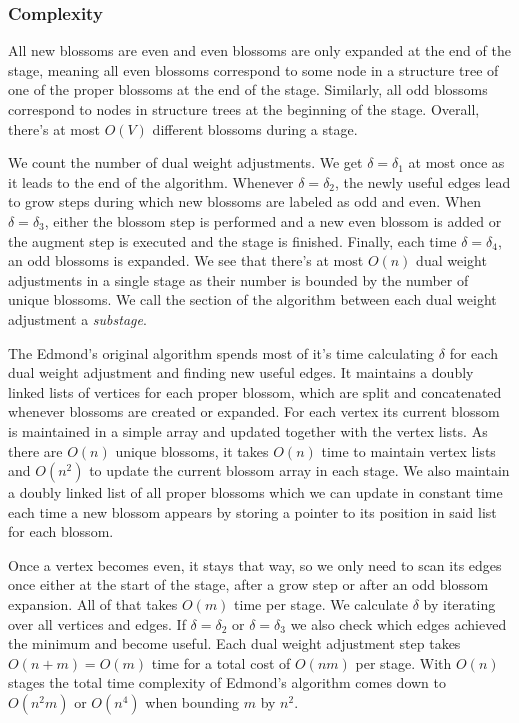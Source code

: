 \subsubsection{Complexity}

All new blossoms are even and even blossoms are only expanded at the end of the stage, meaning all even blossoms correspond to some node in a structure tree of one of the proper blossoms at the end of the stage. Similarly, all odd blossoms correspond to nodes in structure trees at the beginning of the stage. Overall, there's at most $O(V)$ different blossoms during a stage. 

We count the number of dual weight adjustments. We get $\delta = \delta_1$ at most once as it leads to the end of the algorithm. Whenever $\delta = \delta_2$, the newly useful edges lead to grow steps during which new blossoms are labeled as odd and even. When $\delta = \delta_3$, either the blossom step is performed and a new even blossom is added or the augment step is executed and the stage is finished. Finally, each time $\delta = \delta_4$, an odd blossoms is expanded. We see that there's at most $O(n)$ dual weight adjustments in a single stage as their number is bounded by the number of unique blossoms. We call the section of the algorithm between each dual weight adjustment a \textit{substage}.

The Edmond's original algorithm spends most of it's time calculating $\delta$ for each dual weight adjustment and finding new useful edges. It maintains a doubly linked lists of vertices for each proper blossom, which are split and concatenated whenever blossoms are created or expanded. For each vertex its current blossom is maintained in a simple array and updated together with the vertex lists. As there are $O(n)$ unique blossoms, it takes $O(n)$ time to maintain vertex lists and $O(n^2)$ to update the current blossom array in each stage. We also maintain a doubly linked list of all proper blossoms which we can update in constant time each time a new blossom appears by storing a pointer to its position in said list for each blossom.

Once a vertex becomes even, it stays that way, so we only need to scan its edges once either at the start of the stage, after a grow step or after an odd blossom expansion. All of that takes $O(m)$ time per stage. We calculate $\delta$ by iterating over all vertices and edges. If $\delta = \delta_2$ or $\delta = \delta_3$ we also check which edges achieved the minimum and become useful. Each dual weight adjustment step takes $O(n+m)=O(m)$ time for a total cost of $O(nm)$ per stage. With $O(n)$ stages the total time complexity of Edmond's algorithm comes down to $O(n^2m)$ or $O(n^4)$ when bounding $m$ by $n^2$.

